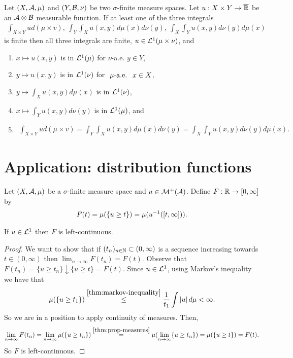\begin{thm}[Fubini]
	\label{thm:fubini}
	Let $(X, \mathcal{A}, \mu)$ and $(Y, \mathcal{B}, \nu)$ be two $\sigma$-finite measure spaces. Let $u : X \times Y \to {\overline{\mathbb{R}}}$ be an $\mathcal{A} \otimes \mathcal{B}$ measurable function. If at least one of the three integrals
	\begin{align*}
		\int_{X\times Y} u d(\mu \times v)
		,\ \int_Y \int_X u(x, y) d\mu(x) d\nu(y)
		,\ \int_X \int_Y u(x, y) d\nu(y) d\mu(x)
	\end{align*}
	is finite then all three integrals are finite, $u \in \mathcal{L}^1(\mu \times \nu)$, and
	\begin{enumerate}
		\item $x \mapsto u(x, y)$ is in $\mathcal{L}^1(\mu)$ for $\nu$-a.e. $y \in Y$,
		\item $y \mapsto u(x, y)$ is in $\mathcal{L}^1(\nu)$ for $\ \mu\text{-a.e. }\ x \in X$,
		\item $y \mapsto \int_X u(x, y)d\mu(x)$ is in $\mathcal{L}^1(\nu)$,
		\item $x \mapsto \int_Y u(x, y)d\nu(y)$ is in $\mathcal{L}^1(\mu)$, and
		\item
		\begin{align*}
			\int_{X\times Y} u d(\mu \times v)
			= \int_Y \int_X u(x, y) d\mu(x) d\nu(y)
			= \int_X \int_Y u(x, y) d\nu(y) d\mu(x).
		\end{align*}
	\end{enumerate}
\end{thm}


\section{Application: distribution functions}

Let $(X, \mathcal{A}, \mu)$ be a $\sigma$-finite measure space and $u \in \mathcal{M}^+(\mathcal{A})$. Define $F : \mathbb{R} \to [0, \infty]$ by
\begin{align}
	F(t) = \mu(\{u \geq t\}) = \mu({u}^{-1}([t, \infty])).
\end{align}

\begin{lem}
	If $u \in \mathcal{L}^1$ then $F$ is left-continuous.
\end{lem}

\begin{proof}
	We want to show that if $(t_n)_{n\in\mathbb{N}} \subset (0, \infty)$ is a sequence increasing towards $t \in (0, \infty)$ then $\lim_{n\to\infty} F(t_n) = F(t)$. Observe that $F(t_n) = \{u \geq t_n\} \downarrow \{u \geq t\} = F(t)$. Since $u \in \mathcal{L}^1$, using Markov's inequality we have that
	\begin{align*}
		\mu(\{u \geq t_1\})
		\overset{\ref{thm:markov-inequality}}{\leq} \frac{1}{t_1} \int \left\vert{u}\right\vert d\mu < \infty.
	\end{align*}
	So we are in a position to apply continuity of measures. Then,
	\begin{align*}
		\lim_{n\to\infty} F(t_n)
		= \lim_{n\to\infty} \mu(\{u \geq t_n\})
		\overset{\ref{thm:prop-measures}}{=} \mu( \lim_{n\to\infty} \{u \geq t_n\})
		= \mu(\{u \geq t\}) = F(t).
	\end{align*}
	So $F$ is left-continuous.
\end{proof}

